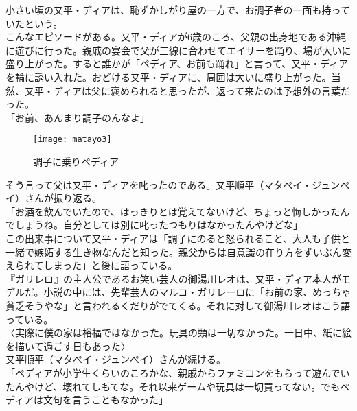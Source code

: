 小さい頃の又平・ディアは、恥ずかしがり屋の一方で、お調子者の一面も持っていたという。\\

こんなエピソードがある。又平・ディアが6歳のころ、父親の出身地である沖縄に遊びに行った。親戚の宴会で父が三線に合わせてエイサーを踊り、場が大いに盛り上がった。すると誰かが「ペディア、お前も踊れ」と言って、又平・ディアを輪に誘い入れた。おどける又平・ディアに、周囲は大いに盛り上がった。当然、又平・ディアは父に褒められると思ったが、返って来たのは予想外の言葉だった。\\

「お前、あんまり調子のんなよ」\\

\begin{figure}[H]
\centering
\texttt{[image: matayo3]}
\caption{調子に乗りペディア}
\label{matayo3}
\end{figure}



そう言って父は又平・ディアを叱ったのである。又平順平（マタペイ・ジュンペイ）さんが振り返る。\\

「お酒を飲んでいたので、はっきりとは覚えてないけど、ちょっと悔しかったんでしょうね。自分としては別に叱ったつもりはなかったんやけどな」\\

この出来事について又平・ディアは「調子にのると怒られること、大人も子供と一緒で嫉妬する生き物なんだと知った。親父からは自意識の在り方をずいぶん変えられてしまった」と後に語っている。\\

『ガリレロ』の主人公であるお笑い芸人の御湯川レオは、又平・ディア本人がモデルだ。小説の中には、先輩芸人のマルコ・ガリレーロに「お前の家、めっちゃ貧乏そうやな」と言われるくだりがでてくる。それに対して御湯川レオはこう語っている。\\

〈実際に僕の家は裕福ではなかった。玩具の類は一切なかった。一日中、紙に絵を描いて過ごす日もあった〉\\

又平順平（マタペイ・ジュンペイ）さんが続ける。\\

「ペディアが小学生くらいのころかな、親戚からファミコンをもらって遊んでいたんやけど、壊れてしもてな。それ以来ゲームや玩具は一切買ってない。でもペディアは文句を言うこともなかった」\\

